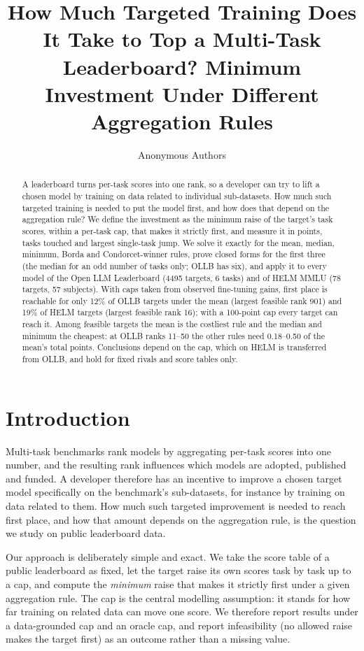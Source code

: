 \documentclass{article}
\title{How Much Targeted Training Does It Take to Top a Multi-Task Leaderboard? Minimum Investment Under Different Aggregation Rules}
\author{Anonymous Authors}
\begin{document}
\maketitle

\begin{abstract}
A leaderboard turns per-task scores into one rank, so a developer can try to lift a chosen model by training on data related to individual sub-datasets. How much such targeted training is needed to put the model first, and how does that depend on the aggregation rule? We define the investment as the minimum raise of the target's task scores, within a per-task cap, that makes it strictly first, and measure it in points, tasks touched and largest single-task jump. We solve it exactly for the mean, median, minimum, Borda and Condorcet-winner rules, prove closed forms for the first three (the median for an odd number of tasks only; OLLB has six), and apply it to every model of the Open LLM Leaderboard (4495 targets, 6 tasks) and of HELM MMLU (78 targets, 57 subjects). With caps taken from observed fine-tuning gains, first place is reachable for only 12\% of OLLB targets under the mean (largest feasible rank 901) and 19\% of HELM targets (largest feasible rank 16); with a 100-point cap every target can reach it. Among feasible targets the mean is the costliest rule and the median and minimum the cheapest: at OLLB ranks 11--50 the other rules need 0.18--0.50 of the mean's total points. Conclusions depend on the cap, which on HELM is transferred from OLLB, and hold for fixed rivals and score tables only.
\end{abstract}

\section{Introduction}
\label{sec:intro}
Multi-task benchmarks rank models by aggregating per-task scores into one number, and the resulting rank influences which models are adopted, published and funded. A developer therefore has an incentive to improve a chosen target model specifically on the benchmark's sub-datasets, for instance by training on data related to them. How much such targeted improvement is needed to reach first place, and how that amount depends on the aggregation rule, is the question we study on public leaderboard data.

Our approach is deliberately simple and exact. We take the score table of a public leaderboard as fixed, let the target raise its own scores task by task up to a cap, and compute the \emph{minimum} raise that makes it strictly first under a given aggregation rule. The cap is the central modelling assumption: it stands for how far training on related data can move one score. We therefore report results under a data-grounded cap and an oracle cap, and report infeasibility (no allowed raise makes the target first) as an outcome rather than a missing value.
\end{document}
